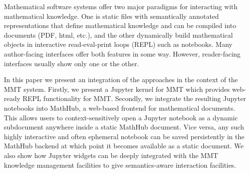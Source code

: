 Mathematical software systems offer two major paradigms for interacting with mathematical knowledge.
One is static files with semantically annotated representations that define mathematical knowledge and can be compiled into documents (PDF, html, etc.), and the other dynamically build mathematical objects in interactive read-eval-print loops (REPL) such as notebooks.
Many author-facing interfaces offer both features in some way.
However, reader-facing interfaces usually show only one or the other.

In this paper we present an integration of the approaches in the context of the MMT system.
Firstly, we present a Jupyter kernel for MMT which provides web-ready REPL functionality for MMT.
Secondly, we integrate the resulting Jupyter notebooks into MathHub, a web-based frontend for mathematical documents.
This allows users to context-sensitively open a Jupyter notebook as a dynamic subdocument anywhere inside a static MathHub document.
Vice versa, any such highly interactive and often ephemeral notebook can be saved persistently in the MathHub backend at which point it becomes available as a static document.
We also show how Jupyter widgets can be deeply integrated with the MMT knowledge management facilities to give semantics-aware interaction facilities.


